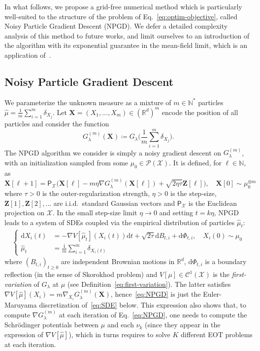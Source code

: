 \documentclass[11pt]{article}
\newcommand{\rev}[1]{{#1}}
\newcommand{\RR}{\mathbb{R}}
\newcommand{\NN}{\mathbb{N}}
\newcommand{\Cc}{\mathcal{C}}
\newcommand{\Pp}{\mathcal{P}}
\newcommand{\Xx}{\mathcal{X}}
\renewcommand{\d}{\mathrm{d}}
\begin{document}
In what follows, we propose a grid-free numerical method which is particularly well-suited to the structure of the problem of Eq.~\eqref{eq:optim-objective}, called Noisy Particle Gradient Descent (NPGD). We defer a detailed complexity analysis of this method to future works, and limit ourselves to an introduction of the algorithm with its exponential guarantee in the mean-field limit, which is an application of~\cite{chizat2022mean,nitanda2022convex}.

\subsection{Noisy Particle Gradient Descent} 
We parameterize the unknown measure as a mixture of $m\in \NN^*$ particles $\hat \mu=\frac1m \sum_{i=1}^m \delta_{X_j}$. Let $\mathbf{X} = (X_1,\dots,X_m)\in (\RR^d)^m$ encode the position of all particles and consider the function
\begin{equation}\label{eq:Gm}
G^{(m)}_\lambda(\mathbf{X}) \coloneqq G_\lambda\Big(\frac1m \sum_{i=1}^m \delta_{X_j}\Big).
\end{equation}
The NPGD algorithm we consider is simply a noisy gradient descent on $G^{(m)}_\lambda$, with an initialization sampled from some $\mu_0\in \Pp(\Xx)$. It is defined, for $\ell\in \NN$, as 
\begin{equation}\label{eq:NPGD}
\mathbf{X}[\ell+1] = \mathsf{P}_\Xx\big(\mathbf{X}[\ell] - m\eta \nabla G^{(m)}_\lambda(\mathbf{X}[\ell]) + \sqrt{2\eta\tau}   \mathbf{Z}[\ell]\big),\quad \mathbf{X}[0] \sim \mu_0^{\otimes m}
\end{equation}
where $\tau>0$ is the outer-regularization strength, $\eta>0$ is the step-size, $ \mathbf{Z}[1],  \mathbf{Z}[2],\dots$ are i.i.d.~standard Gaussian vectors and $ \mathsf{P}_\Xx$ is the Euclidean projection on $\Xx$. In the small step-size limit $\eta\to 0$ and setting $t=k\eta$, NPGD leads to a system of SDEs coupled via the empirical distribution of particles $\hat \mu_t$:
\begin{align}\label{eq:SDE}
\left\{
\begin{aligned}
\d X_i(t) &=  - \nabla V[\hat \mu_t](X_i(t))\d t + \sqrt{2\tau}   \d B_{t,i}  + \d\Phi_{t,i},\quad X_i(0) \sim \mu_0 \\
\hat \mu_t &=\frac1m \sum_{i=1}^m \delta_{X_i(t)}
\end{aligned}
\right.
\end{align}
where $(B_{t,i})_{t\geq 0}$ are independent Brownian motions in $\RR^d$, $\d\Phi_{t,i}$ is a boundary reflection (in the sense of Skorokhod problem) and $V[\mu]\in \Cc^1(\Xx)$ is the \emph{first-variation} of $G_\lambda$ at $\mu$ (see Definition~\ref{eq:first-variation}). The latter satisfies $\nabla V[\hat \mu](X_i)=m\nabla_{X_i} G^{(m)}_\lambda(\mathbf{X})$, hence~\eqref{eq:NPGD} is just the Euler-Maruyama discretization of~\eqref{eq:SDE} below. \rev{This expression also shows that, to compute $\nabla G^{(m)}_\lambda$ at each iteration of Eq.~\eqref{eq:NPGD}, one needs to compute the Schr\"odinger potentials between $\hat \mu$ and each $\nu_k$ (since they appear in the expression of $\nabla V[\hat \mu]$), which in turns requires to solve $K$ different EOT problems at each iteration.}
\end{document}

